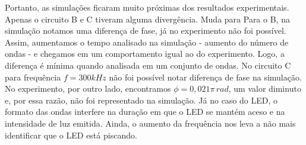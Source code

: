 \documentclass[a4paper, 11pt]{article}
\begin{document}
Portanto, as simulações ficaram muito próximas dos resultados experimentais. Apenas o circuito B e C tiveram alguma divergência. Muda para Para o B, na simulação notamos uma diferença de fase, já no experimento não foi possível. Assim, aumentamos o tempo analisado na simulação - aumento do número de ondas - e chegamos em um comportamento igual ao do experimento. Logo, a diferença é mínima quando analisada em um conjunto de ondas. No circuito C para frequência $f = 300kHz$ não foi possível notar diferença de fase na simulação. No experimento, por outro lado, encontramos  $\phi = 0,021 \pi \, rad$, um valor diminuto e, por essa razão, não foi representado na simulação. Já no caso do LED, o formato das ondas interfere na duração em que o LED se mantém aceso e na intensidade de luz emitida. Ainda, o aumento da frequência nos leva a não mais identificar que o LED está piscando.\\










\end{document}
